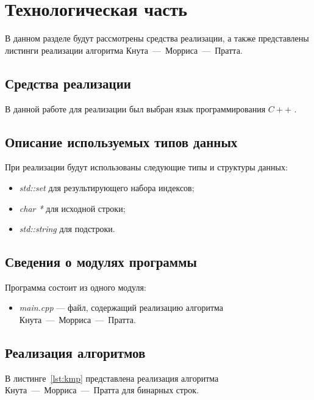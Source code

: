 \chapter{Технологическая часть}

В данном разделе будут рассмотрены средства реализации, а также представлены листинги реализации алгоритма Кнута~---~Морриса~---~Пратта.

\section{Средства реализации}

В данной работе для реализации был выбран язык программирования $C++$ \cite{cpp}.

\section{Описание используемых типов данных}

При реализации будут использованы следующие типы и структуры данных:
\begin{itemize}[label=---]
	\item \textit{std::set} для результирующего набора индексов;
	\item \textit{char *} для исходной строки;
	\item \textit{std::string} для подстроки.
\end{itemize}

\section{Сведения о модулях программы}

Программа состоит из одного модуля:
\begin{itemize}[label={---}]
	\item \textit{main.cpp} --- файл, содержащий реализацию алгоритма Кнута~---~Морриса~---~Пратта.
\end{itemize}

\section{Реализация алгоритмов}

В листинге~\ref{lst:kmp} представлена реализация алгоритма Кнута~---~Морриса~---~Пратта для бинарных строк.




